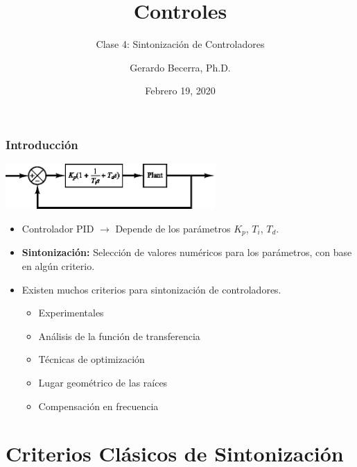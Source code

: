 \documentclass[aspectratio=169]{beamer}
\title{Controles}
\subtitle{\small Clase 4: Sintonización de Controladores}
\author{Gerardo Becerra, Ph.D.}
\institute{Pontificia Universidad Javeriana\\ Departamento de Electrónica}
\date{Febrero 19, 2020}
\theoremstyle{definition}
\theoremstyle{plain}
\theoremstyle{remark}
\begin{document}
\frame{\titlepage}	


\begin{frame}[<+->]\frametitle{Introducción}
\vspace*{5mm}
\centering
\includegraphics[width=8cm]{images/PIDController.eps}
\begin{itemize}
	\item Controlador PID $\rightarrow$ Depende de los parámetros $K_p$, $T_i$, $T_d$.
	\item \textbf{Sintonización:} Selección de valores numéricos para los parámetros, con base en algún criterio.
	\item Existen muchos criterios para sintonización de controladores.
	\begin{itemize}
		\item Experimentales
		\item Análisis de la función de transferencia
		\item Técnicas de optimización
		\item Lugar geométrico de las raíces
		\item Compensación en frecuencia
	\end{itemize}
\end{itemize}
\end{frame}

\section{Criterios Clásicos de Sintonización}
\end{document}
